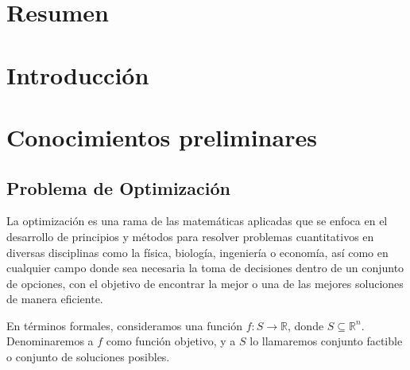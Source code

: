 \documentclass[12pt,titlepage,twoside,openright]{book}
\begin{document}
\frontmatter{}



\pagestyle{plain}


\tableofcontents
\newpage
\listoffigures




\mainmatter{}
\pagestyle{fancy}
\renewcommand{\chaptermark}[1]{%
	\markboth{\chaptername
		\ \thechapter.\ #1}{}}
\fancyhead[RO,LE]{\bfseries \thepage}
\fancyfoot{}
\setlength{\parindent}{0pt}
\setlength{\parskip}{1.5ex}



\chapter{Resumen}



\chapter{Introducci\'on}
\chapter{Conocimientos preliminares}
\section{Problema de Optimizaci\'on}

La optimización es una rama de las matemáticas aplicadas que se enfoca en el desarrollo de principios y métodos para resolver problemas cuantitativos en diversas disciplinas como la f\'isica, biolog\'ia, ingenier\'ia o econom\'ia, as\'i como en cualquier campo donde sea necesaria la toma de decisiones dentro de un conjunto de opciones, con el objetivo de encontrar la mejor o una de las mejores soluciones de manera eficiente.

En t\'erminos formales, consideramos una funci\'on \( f : S \rightarrow \mathbb{R} \), donde \( S \subseteq \mathbb{R}^n \). Denominaremos a \( f \) como funci\'on objetivo, y a \( S \) lo llamaremos conjunto factible o conjunto de soluciones posibles.
\end{document}
